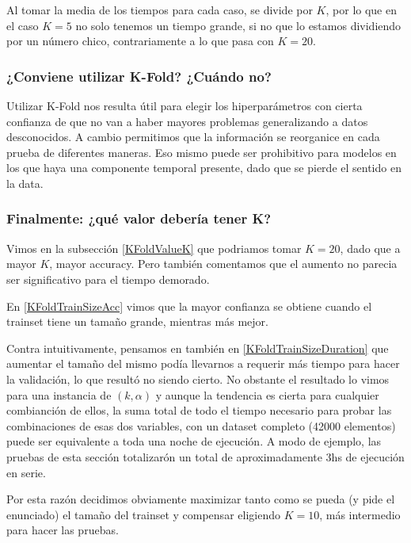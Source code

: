 Al tomar la media de los tiempos para cada caso, se divide por $K$, por lo que en el caso $K=5$ no solo tenemos un tiempo grande, si no que lo estamos dividiendo por un número chico, contrariamente a lo que pasa con $K=20$.

\subsubsection{¿Conviene utilizar K-Fold? ¿Cuándo no?}

Utilizar K-Fold nos resulta útil para elegir los hiperparámetros con cierta confianza de que no van a haber mayores problemas generalizando a datos desconocidos. A cambio permitimos que la información se reorganice en cada prueba de diferentes maneras. Eso mismo puede ser prohibitivo para modelos en los que haya una componente temporal presente, dado que se pierde el sentido en la data.

\subsubsection{Finalmente: ¿qué valor debería tener K?}

Vimos en la subsección \ref{KFoldValueK} que podriamos tomar $K=20$, dado que a mayor $K$, mayor accuracy. Pero también comentamos que el aumento no parecia ser significativo para el tiempo demorado.

En \ref{KFoldTrainSizeAcc} vimos que la mayor confianza se obtiene cuando el trainset tiene un tamaño grande, mientras más mejor.

Contra intuitivamente, pensamos en también en \ref{KFoldTrainSizeDuration} que aumentar el tamaño del mismo podía llevarnos a requerir más tiempo para hacer la validación, lo que resultó no siendo cierto. No obstante el resultado lo vimos para una instancia de $(k, \alpha)$ y aunque la tendencia es cierta para cualquier combianción de ellos, la suma total de todo el tiempo necesario para probar las combinaciones de esas dos variables, con un dataset completo (42000 elementos) puede ser equivalente a toda una noche de ejecución. A modo de ejemplo, las pruebas de esta sección totalizarón un total de aproximadamente 3hs de ejecución en serie.

Por esta razón decidimos obviamente maximizar tanto como se pueda (y pide el enunciado) el tamaño del trainset y compensar eligiendo $K=10$, más intermedio para hacer las pruebas.